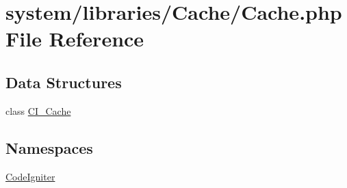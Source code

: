 \hypertarget{_cache_8php}{}\section{system/libraries/\+Cache/\+Cache.php File Reference}
\label{_cache_8php}
\subsection*{Data Structures}
\begin{DoxyCompactItemize}
\item 
class \mbox{\hyperlink{class_c_i___cache}{C\+I\+\_\+\+Cache}}
\end{DoxyCompactItemize}
\subsection*{Namespaces}
\begin{DoxyCompactItemize}
\item 
 \mbox{\hyperlink{namespace_code_igniter}{Code\+Igniter}}
\end{DoxyCompactItemize}
